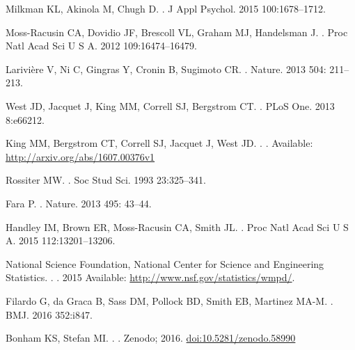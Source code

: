 \documentclass[10pt,letterpaper]{article}
\begin{document}
\begin{flushleft}
\begin{thebibliography}{10}
Milkman KL, Akinola M, Chugh D.
.
\newblock J Appl Psychol. 2015 100:1678–1712.

Moss-Racusin CA, Dovidio JF, Brescoll VL, Graham MJ, Handelsman J.
.
\newblock  Proc Natl Acad Sci U S A. 2012 109:16474–16479.

Larivi{\`e}re V, Ni C, Gingras Y, Cronin B, Sugimoto CR.
.
\newblock  Nature. 2013 504: 211–213.

West JD, Jacquet J, King MM, Correll SJ, Bergstrom CT.
.
\newblock PLoS One. 2013 8:e66212.

King MM, Bergstrom CT, Correll SJ, Jacquet J, West JD.
.
. Available: \url{http://arxiv.org/abs/1607.00376v1}

Rossiter MW.
.
\newblock  Soc Stud Sci. 1993 23:325–341.


Fara P.
.
\newblock Nature. 2013  495: 43–44.

Handley IM, Brown ER, Moss-Racusin CA, Smith JL.
.
\newblock  Proc Natl Acad Sci U S A.  2015 112:13201–13206.


National Science Foundation, National Center for Science and Engineering Statistics.
.
\newblock  [Internet]. 2015 Available: \url{http://www.nsf.gov/statistics/wmpd/}.

 Filardo G, da Graca B, Sass DM, Pollock BD, Smith EB, Martinez MA-M.
.
\newblock BMJ. 2016 352:i847.


Bonham KS, Stefan MI.
.
\newblock   [Internet]. Zenodo; 2016. \url{doi:10.5281/zenodo.58990}


\end{thebibliography}
\end{flushleft}
\end{document}
